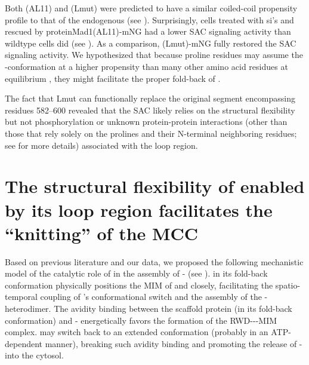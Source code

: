 Both (AL11) and (Lmut) were predicted to have a similar coiled-coil propensity profile to that of the endogenous  (see ). Surprisingly, cells treated with si's and rescued by protein{Mad1}(AL11)-mNG had a lower SAC signaling activity than wildtype cells did (see ). As a comparison, (Lmut)-mNG fully restored the SAC signaling activity. We hypothesized that because proline residues may assume the -conformation at a higher propensity than many other amino acid residues at equilibrium \cite{Ramachandran1976}, they might facilitate the proper fold-back of .

The fact that Lmut can functionally replace the original segment encompassing residues 582--600 revealed that the SAC likely relies on the structural flexibility but not phosphorylation or unknown protein-protein interactions (other than those that rely solely on the prolines and their N-terminal neighboring residues; see  for more details) associated with the loop region.

\section{The structural flexibility of  enabled by its loop region facilitates the ``knitting'' of the MCC}
\label{FinalKnittingModel}

Based on previous literature and our data, we proposed the following mechanistic model of the catalytic role of  in the assembly of - (see ).  in its fold-back conformation physically positions the MIM of  and  closely, facilitating the spatio-temporal coupling of 's conformational switch and the assembly of the - heterodimer. The avidity binding between the scaffold protein  (in its fold-back conformation) and - energetically favors the formation of the RWD---MIM complex.  may switch back to an extended conformation (probably in an ATP-dependent manner), breaking such avidity binding and promoting the release of - into the cytosol.

